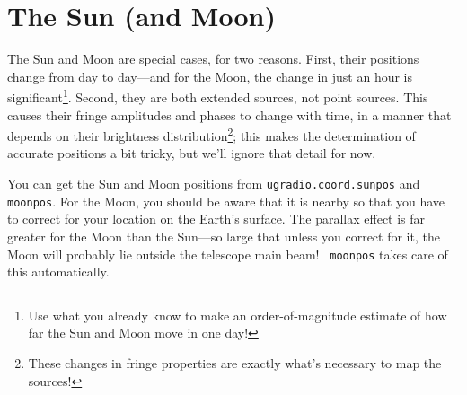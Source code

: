 \documentclass[11pt,preprint]{aastex}
\begin{document}
%
%
%

\section{The Sun (and Moon)}

\noindent
	The Sun and Moon are special cases, for two reasons. First, 
their positions change from day to day---and for the Moon, the change in
just an hour is significant\footnote{Use what you already know to make
an order-of-magnitude estimate of how far the Sun and Moon move in one
day!}.  Second, they are both extended sources, not point sources. This
causes their fringe amplitudes and phases to change with time, in a
manner that depends on their brightness distribution\footnote{These
changes in fringe properties are exactly what's necessary to map the
sources!}; this makes the determination of accurate positions a bit
tricky, but we'll ignore that detail for now.

	You can get the Sun and Moon positions from 
        {\tt ugradio.coord.sunpos} and {\tt moonpos}.  For the Moon, you should be aware
        that it is nearby so that you have to correct for your location
        on the Earth's surface. The parallax effect is far greater for
        the Moon than the Sun---so large that unless you correct for it,
        the Moon will probably lie outside the telescope main beam! {\tt
          moonpos} takes care of this automatically.
\end{document}
